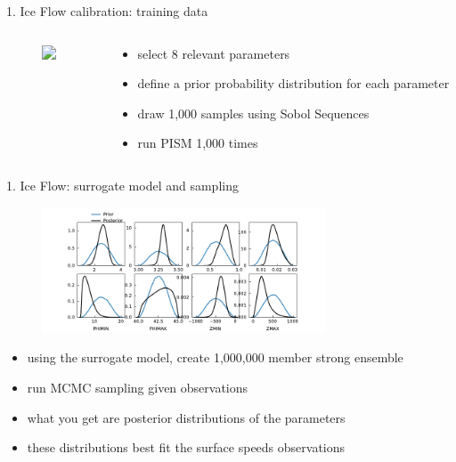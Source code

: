 \documentclass[hide notes,intlimits]{beamer}
\begin{document}
\begin{frame}{1. Ice Flow calibration: training data}
  \begin{columns}[c]
    \begin{column}{0.5\textwidth}
      \begin{figure}
        \includegraphics<1->[width=.95\textwidth]{calib-speeds}
      \end{figure}
    \end{column}
    \begin{column}{.5\textwidth}
      \begin{itemize}
      \item select 8 relevant parameters
      \item define a prior probability distribution for each parameter
      \item draw 1,000 samples using Sobol Sequences
      \item run PISM 1,000 times
      \end{itemize}
    \end{column}
  \end{columns}  
\end{frame}




\begin{frame}{1. Ice Flow: surrogate model and sampling}
  \begin{figure}
    \includegraphics[width=0.75\textwidth]{prior_posterior}
  \end{figure}
  \begin{itemize}
  \item using the surrogate model, create 1,000,000 member strong ensemble
  \item run MCMC sampling given observations
  \item what you get are posterior distributions of the parameters
  \item these distributions best fit the surface speeds observations
  \end{itemize}
\end{frame}
\end{document}
